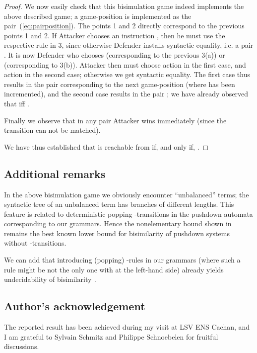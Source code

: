 \documentclass[a4paper,11pt]{article}
\begin{document}
\begin{proof}
We now easily check that this bisimulation game indeed implements the
above described game; a game-position  
 is implemented as the
pair~(\ref{eq:pairposition}). The points 1 and 2 directly correspond
to the previous points 1 and 2.
If Attacker chooses an instruction , 
then he
must use the respective rule  in 3, since
otherwise Defender installs syntactic equality, i.e. a pair .
It is now Defender who chooses  (corresponding
to the previous 3(a)) or  (corresponding
to 3(b)). Attacker then must
choose action  in the first case, and action  in the second
case; otherwise we get syntactic equality.
The first case thus results in the pair 
 corresponding to the next game-position
(where  has been incremented), and the second case results in
the pair ; we have already observed that 
 iff .

Finally we observe that in any pair 
 Attacker wins immediately
(since the transition  can not be
matched).

We have thus established that  is reachable from
 if, and only if, 
.
\end{proof}

\subsection*{Additional remarks}

In the above bisimulation game we obviously encounter ``unbalanced'' terms; 
the syntactic tree of an unbalanced term has branches of different lengths. 
This feature is related to deterministic popping
-transitions in the pushdown automata corresponding to
our grammars.
Hence the nonelementary bound shown in~\cite{BGKM12} remains
the best known lower bound for bisimilarity of pushdown systems
without -transitions.


We can add that introducing (popping) -rules
 in our grammars (where such a
rule might be not the only one with  at the
left-hand side) already yields undecidability of
bisimilarity~\cite{DBLP:journals/jacm/JancarS08}.

\subsection*{Author's acknowledgement}

The reported result has been achieved during my visit at LSV ENS
Cachan, and 
I am grateful to Sylvain Schmitz and Philippe Schnoebelen for
fruitful discussions.





\end{document}
